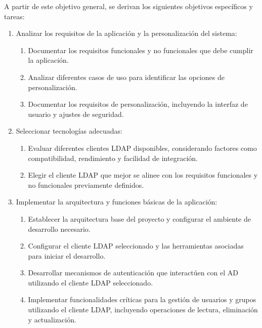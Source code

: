 A partir de este objetivo general, se derivan los siguientes objetivos específicos y tareas:

\begin{enumerate}[label=\arabic*., itemindent=*, leftmargin=*]

    \item Analizar los requisitos de la aplicación y la personalización del sistema:
          \begin{enumerate}[label=\arabic{enumi}.\arabic*., leftmargin=*]
              \item Documentar los requisitos funcionales y no funcionales que debe cumplir la aplicación.
              \item Analizar diferentes casos de uso para identificar las opciones de personalización.
              \item Documentar los requisitos de personalización, incluyendo la interfaz de usuario y ajustes de seguridad.
          \end{enumerate}

    \item Seleccionar tecnologías adecuadas:
          \begin{enumerate}[label=\arabic{enumi}.\arabic*., leftmargin=*]
              \item Evaluar diferentes clientes LDAP disponibles, considerando factores como compatibilidad, rendimiento y facilidad de integración.
              \item Elegir el cliente LDAP que mejor se alinee con los requisitos funcionales y no funcionales previamente definidos.
          \end{enumerate}

    \item Implementar la arquitectura y funciones básicas de la aplicación:
          \begin{enumerate}[label=\arabic{enumi}.\arabic*., leftmargin=*]
              \item Establecer la arquitectura base del proyecto y configurar el ambiente de desarrollo necesario.
              \item Configurar el cliente LDAP seleccionado y las herramientas asociadas para iniciar el desarrollo.
              \item Desarrollar mecanismos de autenticación que interactúen con el AD utilizando el cliente LDAP seleccionado.
              \item Implementar funcionalidades críticas para la gestión de usuarios y grupos utilizando el cliente LDAP, incluyendo operaciones de lectura, eliminación y actualización.
          \end{enumerate}


\end{enumerate}
